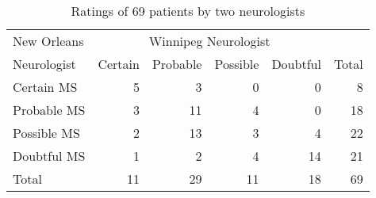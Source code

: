 \begin{table}[htb]
\caption{Ratings of 69 patients by two neurologists}\label{tab:msdiag}
\begin{center}
 \begin{tabular}{l|rrrr|r}
  \hline
  New Orleans & \multicolumn{4}{c|}{Winnipeg Neurologist} & \\
  Neurologist & Certain & Probable & Possible & Doubtful & Total \\ 
  \hline
  Certain  MS & 5 & 3 & 0 & 0 & 8 \\ 
  Probable MS & 3 & 11 & 4 & 0 & 18 \\ 
  Possible MS & 2 & 13 & 3 & 4 & 22 \\ 
  Doubtful MS & 1 & 2 & 4 & 14 & 21 \\ 
  \hline
  Total       & 11 & 29 & 11 & 18 & 69 \\ 
  \hline
 \end{tabular}
\end{center}
\end{table}

